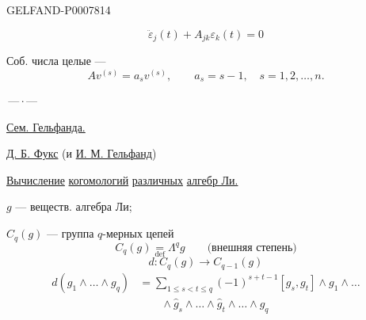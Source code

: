 \begin{GelfandAdjacentEvidence}{GELFAND-P000781}{4}

\[
\ddot\varepsilon_j(t)+A_{jk}\varepsilon_k(t)=0
\]
\end{GelfandAdjacentEvidence}


Соб. числа целые ---
\[
Av^{(s)}=a_s v^{(s)},\qquad a_s=s-1,\quad s=1,2,\ldots,n.
\]

\begin{center}\(\text{---}\,\cdot\,\text{---}\)\end{center}



\qquad\underline{Сем. Гельфанда.}

\underline{Д. Б. Фукс} (и \underline{И. М. Гельфанд})

\underline{Вычисление} \underline{когомологий} \underline{различных} \underline{алгебр Ли.}

\(g\) --- веществ. алгебра Ли;

\(C_q(g)\) --- группа \(q\)-мерных цепей
\[
C_q(g)\underset{\mathrm{def}}{=}\Lambda^q g
\qquad\text{(внешняя степень)}
\]
\begin{equation}
d:C_q(g)\longrightarrow C_{q-1}(g)\tag{1}
\end{equation}
\begin{equation}
\begin{aligned}
d(g_1\wedge\ldots\wedge g_q)
&=\sum_{1\leq s<t\leq q}(-1)^{s+t-1}
[g_s,g_t]\wedge g_1\wedge\ldots\\
&\qquad\wedge\hat g_s\wedge\ldots\wedge\hat g_t\wedge\ldots\wedge g_q
\end{aligned}\tag*{(1)'}
\end{equation}


